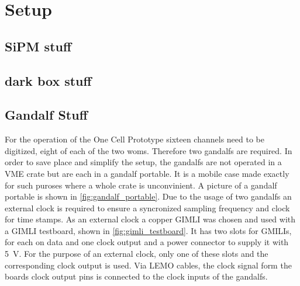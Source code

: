 \chapter{Setup}

\section{SiPM stuff}


\section{dark box stuff}


\section{Gandalf Stuff}

For the operation of the One Cell Prototype sixteen channels need to be digitized, eight of each of the two \acp{wom}.
Therefore two \acp{gandalf} are required.
In order to save place and simplify the setup, the \acp{gandalf} are not operated in a VME crate but are each in a \ac{gandalf} portable.
It is a mobile case made exactly for such puroses where a whole crate is unconvinient.
A picture of a \ac{gandalf} portable is shown in \autoref{fig:gandalf_portable}.
Due to the usage of two \acp{gandalf} an external clock is required to ensure a syncronized sampling frequency and clock for time stamps.
As an external clock a copper GIMLI was chosen and used with a GIMLI testboard, shown in \autoref{fig:gimli_testboard}.
It has two slots for GMILIs, for each on data and one clock output and a power connector to supply it with \SI{5}{\volt}.
For the purpose of an external clock, only one of these slots and the corresponding clock output is used.
Via LEMO cables, the clock signal form the boards clock output pins is connected to the clock inputs of the \acp{gandalf}.



